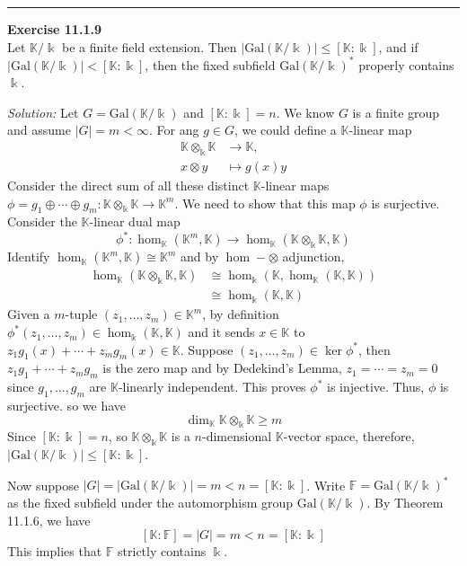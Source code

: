\documentclass[a4paper, 12pt]{article}
\newenvironment{problem}[2][Exercise]
    { \begin{mdframed}[backgroundcolor=gray!20] \textbf{#1 #2} \\}
    {  \end{mdframed}}
\newenvironment{solution}
    {\textit{Solution:}}
    {}
\newcommand{\Gal}{\text{Gal}}
\begin{document}
\noindent\rule{7in}{2.8pt}
\begin{problem}{11.1.9}
Let \(\mathbb{K}/\Bbbk\) be a finite field extension. Then \(|\Gal(\mathbb{K}/\Bbbk)|\leq [\mathbb{K}:\Bbbk]\), and if \(|\Gal(\mathbb{K}/\Bbbk)|<[\mathbb{K}:\Bbbk]\), then 
the fixed subfield \(\Gal(\mathbb{K}/\Bbbk)^*\) properly contains \(\Bbbk\).
\end{problem}
\begin{solution}
Let \(G=\Gal(\mathbb{K}/\Bbbk)\) and \([\mathbb{K}:\Bbbk]=n\). We know \(G\) is a finite group and assume \(|G|=m<\infty\). For ang \(g\in G\), we could define a \(\mathbb{K}\)-linear map 
\begin{align*}
	\mathbb{K}\otimes_\Bbbk \mathbb{K}&\rightarrow \mathbb{K},\\ 
	x\otimes y&\mapsto g(x)y
\end{align*}
Consider the direct sum of all these distinct \(\mathbb{K}\)-linear maps \(\phi=g_1\oplus \cdots \oplus g_m:\mathbb{K}\otimes_\Bbbk \mathbb{K}\rightarrow \mathbb{K}^m\). 
We need to show that this map \(\phi\) is surjective. Consider the \(\mathbb{K}\)-linear dual map
\[\phi^*:\hom_\mathbb{K}(\mathbb{K}^m,\mathbb{K})\rightarrow \hom_\mathbb{K}(\mathbb{K}\otimes_\Bbbk \mathbb{K},\mathbb{K})\]
Identify \(\hom_\mathbb{K}(\mathbb{K}^m,\mathbb{K})\cong \mathbb{K}^m\) and by \(\hom-\otimes\) adjunction, 
\begin{align*}
    \hom_\mathbb{K}(\mathbb{K}\otimes_\Bbbk \mathbb{K},\mathbb{K})&\cong \hom_\Bbbk(\mathbb{K},\hom_\mathbb{K}(\mathbb{K},\mathbb{K}))\\ 
                              &\cong \hom_\Bbbk(\mathbb{K},\mathbb{K})
\end{align*} 
Given a \(m\)-tuple \((z_1,\ldots,z_m)\in \mathbb{K}^m\), by definition \(\phi^*(z_1,\ldots,z_m)\in \hom_\Bbbk(\mathbb{K},\mathbb{K})\) and it sends \(x\in \mathbb{K}\) to 
\(z_1g_1(x)+\cdots+z_mg_m(x)\in \mathbb{K}\). Suppose \((z_1,\ldots,z_m)\in \ker\phi^*\), then \(z_1g_1+\cdots+z_mg_m\) is the zero map and by Dedekind's Lemma, \(z_1=\cdots=z_m=0\) since \(g_1,\ldots,g_m\) are 
\(\mathbb{K}\)-linearly independent. This proves \(\phi^*\) is injective. Thus, \(\phi\) is surjective. 
so we have 
\[\dim_\mathbb{K}\mathbb{K}\otimes_\Bbbk \mathbb{K}\geq m\]
Since \([\mathbb{K}:\Bbbk]=n\), so \(\mathbb{K}\otimes_\Bbbk \mathbb{K}\) is a \(n\)-dimensional \(\mathbb{K}\)-vector space, therefore, \(|\Gal(\mathbb{K}/\Bbbk)|\leq [\mathbb{K}:\Bbbk]\).
\par 
Now suppose \(|G|=|\Gal(\mathbb{K}/\Bbbk)|=m<n=[\mathbb{K}:\Bbbk]\). Write \(\mathbb{F}=\Gal(\mathbb{K}/\Bbbk)^*\) as the fixed subfield under the automorphism group \(\Gal(\mathbb{K}/\Bbbk)\). By Theorem 11.1.6, we have 
\[[\mathbb{K}:\mathbb{F}]=|G|=m<n=[\mathbb{K}:\Bbbk]\]
This implies that \(\mathbb{F}\) strictly contains \(\Bbbk\).
\end{solution}
\end{document}
